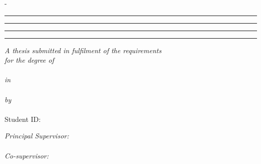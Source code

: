 \begin{titlingpage}
\thispagestyle{empty}
\begin{SingleSpace}
\calccentering{\unitlength}
\begin{adjustwidth*}{\unitlength}{-\unitlength}
\begin{center}
\InstitutionLogo
\ifshowinstitutionlogo\vspace{8mm}\fi

\color{ThesisRule}
\rule[0.5ex]{\linewidth}{2pt}\vspace*{-\baselineskip}\vspace*{3.2pt}
\rule[0.5ex]{\linewidth}{0.7pt}\par
\color{black}
\vspace{6mm}
{\LARGE\bfseries \ThesisTitle\par}
\vspace{6mm}
\color{ThesisRule}
\rule[0.5ex]{\linewidth}{0.7pt}\vspace*{-\baselineskip}\vspace*{4pt}
\rule[0.5ex]{\linewidth}{2pt}\par
\color{black}

\vspace{13mm}
\emph{A thesis submitted in fulfilment of the requirements}\\[1.5mm]
\emph{for the degree of}\\[7mm]
{\large \DegreeName}\\[2mm]
\emph{in}\\[1mm]
{\large \DisciplineName}\\[4mm]
\emph{by}\\[3mm]
{\Large\bfseries \ThesisAuthor}\\[1mm]
\ifshowstudentid
  {\small Student ID: \StudentID}\\[4mm]
\else
  \vspace{3mm}
\fi

\ifshowprincipalsupervisor
  \emph{Principal Supervisor:}\\[2mm]
  {\large\bfseries \PrincipalSupervisor}\\[4mm]
\fi
\ifshowcosupervisor
  \emph{Co-supervisor:}\\[2mm]
  {\large\bfseries \CoSupervisor}\\[5mm]
\fi

\SchoolName\\[1mm]
\FacultyName\\[2mm]
{\large \InstitutionName}\\[1mm]
\SubmissionMonth{} \SubmissionYear
\end{center}
\end{adjustwidth*}
\end{SingleSpace}
\end{titlingpage}
